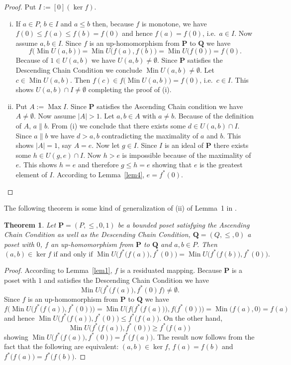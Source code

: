\documentclass[12pt]{article}
\DeclareMathOperator{\Max}{Max}
\DeclareMathOperator{\Min}{Min}
\newtheorem{theorem}{Theorem}[section]
\begin{document}
\begin{proof}
Put $I:=[0](\ker f)$. \\
\begin{enumerate}[(i)]
\item If $a\in P$, $b\in I$ and $a\le b$ then, because $f$ is monotone, we have $f(0)\le f(a)\le f(b)=f(0)$ and hence $f(a)=f(0)$, i.e.\ $a\in I$. Now assume $a,b\in I$. Since $f$ is an up-homomorphism from $\mathbf P$ to $\mathbf Q$ we have
\[
f\big(\Min U(a,b)\big)=\Min U\big(f(a),f(b)\big)=\Min U\big(f(0)\big)=f(0).
\]
Because of $1\in U(a,b)$ we have $U(a,b)\ne\emptyset$. Since $\mathbf P$ satisfies the Descending Chain Condition we conclude $\Min U(a,b)\ne\emptyset$. Let $c\in\Min U(a,b)$. Then $f(c)\in f\big(\Min U(a,b)\big)=f(0)$, i.e.\ $c\in I$. This shows $U(a,b)\cap I\ne\emptyset$ completing the proof of (i).
\item Put $A:=\Max I$. Since $\mathbf P$ satisfies the Ascending Chain condition we have $A\ne\emptyset$. Now assume $|A|>1$. Let $a,b\in A$ with $a\ne b$. Because of the definition of $A$, $a\parallel b$. From (i) we conclude that there exists some $d\in U(a,b)\cap I$. Since $a\parallel b$ we have $d>a,b$ contradicting the maximality of $a$ and $b$. This shows $|A|=1$, say $A=e$. Now let $g\in I$. Since $I$ is an ideal of $\mathbf P$ there exists some $h\in U(g,e)\cap I$. Now $h>e$ is impossible because of the maximality of $e$. This shows $h=e$ and therefore $g\le h=e$ showing that $e$ is the greatest element of $I$. According to Lemma~\ref{lem4}, $e=f^*(0)$.
\end{enumerate}
\end{proof}

The following theorem is some kind of generalization of (ii) of Lemma~1 in \cite{RV}.

\begin{theorem}
Let $\mathbf P=(P,\le,0,1)$ be a bounded poset satisfying the Ascending Chain Condition as well as the Descending Chain Condition, $\mathbf Q=(Q,\le,0)$ a poset with $0$, $f$ an up-homomorphism from $\mathbf P$ to $\mathbf Q$ and $a,b\in P$. Then
\[
(a,b)\in\ker f\text{ if and only if }\Min U\Big(f^*\big(f(a)\big),f^*(0)\Big)=\Min U\Big(f^*\big(f(b)\big),f^*(0)\Big).
\]
\end{theorem}

\begin{proof}
According to Lemma~\ref{lem1}, $f$ is a residuated mapping. Because $\mathbf P$ is a poset with $1$ and satisfies the Descending Chain Condition we have
\[
\Min U\Big(f^*\big(f(a)\big),f^*(0)f\Big)\ne\emptyset.
\]
Since $f$ is an up-homomorphism from $\mathbf P$ to $\mathbf Q$ we have
\[
f\bigg(\Min U\Big(f^*\big(f(a)\big),f^*(0)\Big)\bigg)=\Min U\bigg(f\Big(f^*\big(f(a)\big)\Big),f\big(f^*(0)\big)\bigg)=\Min\big(f(a),0\big)=f(a)
\]
and hence $\Min U\Big(f^*\big(f(a)\big),f^*(0)\Big)\le f^*\big(f(a)\big)$. On the other hand,
\[
\Min U\Big(f^*\big(f(a)\big),f^*(0)\Big)\ge f^*\big(f(a)\big)
\]
showing $\Min U\Big(f^*\big(f(a)\big),f^*(0)\Big)=f^*\big(f(a)\big)$. The result now follows from the fact that the following are equivalent: $(a,b)\in\ker f$, $f(a)=f(b)$ and $f^*\big(f(a)\big)=f^*\big(f(b)\big)$.
\end{proof}
\end{document}
